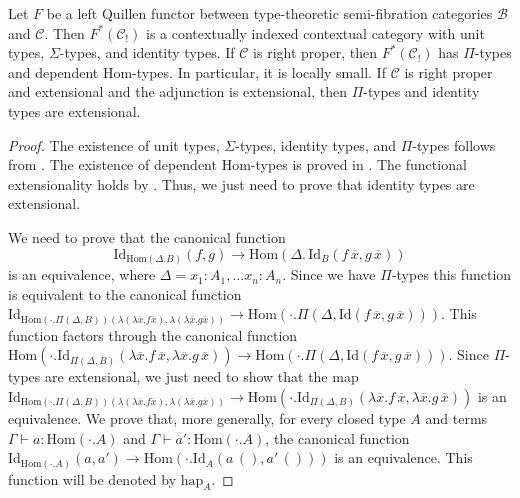 \documentclass[reqno]{amsart}
\theoremstyle{definition}
\theoremstyle{remark}
\newcommand{\fs}[1]{\mathrm{#1}}
\newcommand{\scat}[1]{\mathcal{#1}}
\newcommand{\Hom}{\fs{Hom}}
\newcommand{\Id}{\fs{Id}}
\numberwithin{figure}{section}
\begin{document}
\begin{prop}
Let $F$ be a left Quillen functor between type-theoretic semi-fibration categories $\scat{B}$ and $\scat{C}$.
Then $F^*(\scat{C}_!)$ is a contextually indexed contextual category with unit types, $\Sigma$-types, and identity types.
If $\scat{C}$ is right proper, then $F^*(\scat{C}_!)$ has $\Pi$-types and dependent $\Hom$-types.
In particular, it is locally small.
If $\scat{C}$ is right proper and extensional and the adjunction is extensional, then $\Pi$-types and identity types are extensional.
\end{prop}
\begin{proof}
The existence of unit types, $\Sigma$-types, identity types, and $\Pi$-types follows from \cite{local-universes}.
The existence of dependent $\Hom$-types is proved in .
The functional extensionality holds by \cite[Lemma~5.9]{shul-inv}.
Thus, we just need to prove that identity types are extensional.

We need to prove that the canonical function
\[ \Id_{\Hom(\Delta.B)}(f,g) \to \Hom(\Delta.\,\Id_B(f\,\overline{x},g\,\overline{x})) \] is an equivalence, where $\Delta = x_1 : A_1, \ldots x_n : A_n$.
Since we have $\Pi$-types this function is equivalent to the canonical function $\Id_{\Hom(\cdot . \Pi(\Delta,B))(\lambda(\lambda \overline{x}.f\overline{x}),\lambda(\lambda \overline {x}.g\overline{x}))} \to \Hom(\cdot . \Pi(\Delta, \Id(f\,\overline{x},g\,\overline{x})))$.
This function factors through the canonical function $\Hom(\cdot . \Id_{\Pi(\Delta,B)}(\lambda \overline{x}. f\,\overline{x}, \lambda \overline{x}. g\,\overline{x})) \to \Hom(\cdot . \Pi(\Delta, \Id(f\,\overline{x},g\,\overline{x})))$.
Since $\Pi$-types are extensional, we just need to show that the map $\Id_{\Hom(\cdot . \Pi(\Delta,B))(\lambda(\lambda \overline{x}.f\overline{x}),\lambda(\lambda \overline {x}.g\overline{x}))} \to \Hom(\cdot . \Id_{\Pi(\Delta,B)}(\lambda \overline{x}. f\,\overline{x}, \lambda \overline{x}. g\,\overline{x}))$ is an equivalence.
We prove that, more generally, for every closed type $A$ and terms $\Gamma \vdash a : \Hom(\cdot.A)$ and $\Gamma \vdash a' : \Hom(\cdot.A)$, the canonical function $\Id_{\Hom(\cdot . A)}(a,a') \to \Hom(\cdot . \Id_A(a\,(),a'\,()))$ is an equivalence.
This function will be denoted by $\fs{hap}_A$.


\end{proof}
\end{document}
